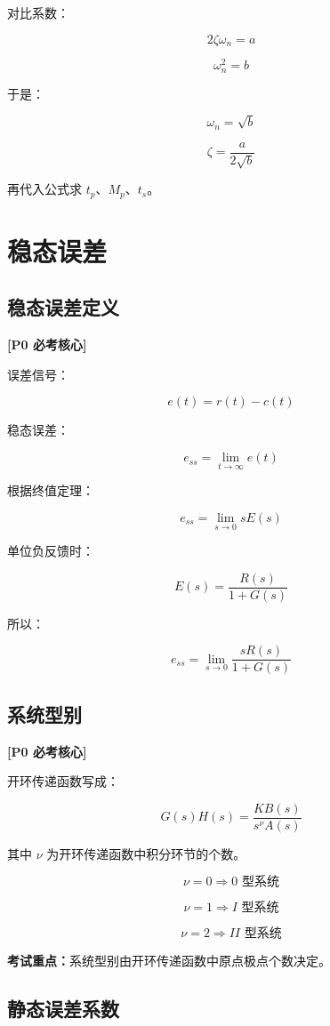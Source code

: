 \documentclass[UTF8,a4paper,12pt]{ctexart}
\newcommand{\Pzero}{\textcolor{p0}{\textbf{[P0 必考核心]}}}
\newcommand{\exam}{\textcolor{p0}{\textbf{考试重点：}}}
\begin{document}
对比系数：

\[
2\zeta\omega_n=a
\]

\[
\omega_n^2=b
\]

于是：

\[
\omega_n=\sqrt{b}
\]

\[
\zeta=\frac{a}{2\sqrt{b}}
\]

再代入公式求 $t_p$、$M_p$、$t_s$。

\section{稳态误差}

\subsection{稳态误差定义}

\Pzero

误差信号：

\[
e(t)=r(t)-c(t)
\]

稳态误差：

\[
e_{ss}=\lim_{t\to\infty}e(t)
\]

根据终值定理：

\[
e_{ss}=\lim_{s\to0}sE(s)
\]

单位负反馈时：

\[
E(s)=\frac{R(s)}{1+G(s)}
\]

所以：

\[
e_{ss}=\lim_{s\to0}\frac{sR(s)}{1+G(s)}
\]

\subsection{系统型别}

\Pzero

开环传递函数写成：

\[
G(s)H(s)=\frac{K B(s)}{s^\nu A(s)}
\]

其中 $\nu$ 为开环传递函数中积分环节的个数。

\[
\nu=0 \Rightarrow 0 \text{ 型系统}
\]

\[
\nu=1 \Rightarrow I \text{ 型系统}
\]

\[
\nu=2 \Rightarrow II \text{ 型系统}
\]

\exam 系统型别由开环传递函数中原点极点个数决定。

\subsection{静态误差系数}
\end{document}
